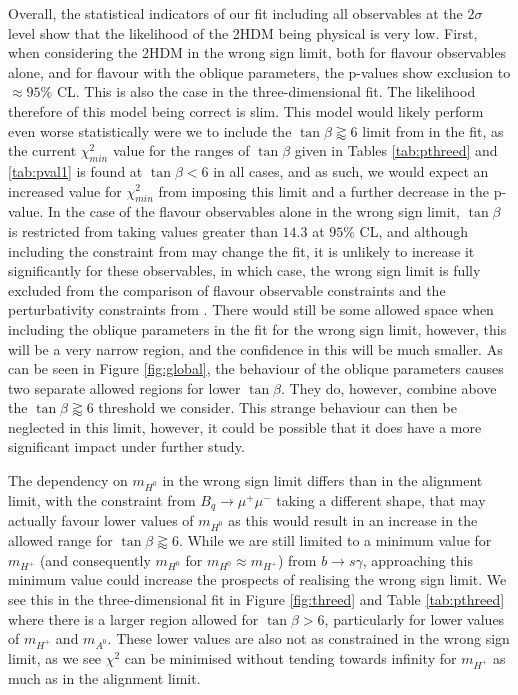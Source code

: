 \documentclass[a4paper,12pt]{article}
\begin{document}
Overall, the statistical indicators of our fit including all observables at the $2\sigma$ level show that the likelihood of the 2HDM being physical is very low. 
First, when considering the 2HDM in the wrong sign limit, both for flavour observables alone, and for flavour with the oblique parameters, the p-values show exclusion to $\approx95\%$ CL. 
This is also the case in the three-dimensional fit. 
The likelihood therefore of this model being correct is slim. 
This model would likely perform even worse statistically were we to include the $\tan\beta\gtrapprox6$ limit from \cite{oliver} in the fit, as the current $\chi^2_{min}$ value for the ranges of $\tan\beta$ given in Tables \ref{tab:pthreed} and \ref{tab:pval1} is found at $\tan\beta<6$ in all cases, and as such, we would expect an increased value for $\chi^2_{min}$ from imposing this limit and a further decrease in the p-value. 
In the case of the flavour observables alone in the wrong sign limit, $\tan\beta$ is restricted from taking values greater than $14.3$ at $95\%$ CL, and although including the constraint from \cite{oliver} may change the fit, it is unlikely to increase it significantly for these observables, in which case, the wrong sign limit is fully excluded from the comparison of flavour observable constraints and the perturbativity constraints from \cite{oliver}.
There would still be some allowed space when including the oblique parameters in the fit for the wrong sign limit, however, this will be a very narrow region, and the confidence in this will be much smaller.
As can be seen in Figure \ref{fig:global}, the behaviour of the oblique parameters causes two separate allowed regions for lower $\tan\beta$. 
They do, however, combine above the $\tan\beta\gtrapprox6$ threshold we consider. 
This strange behaviour can then be neglected in this limit, however, it could be possible that it does have a more significant impact under further study.

The dependency on $m_{H^0}$ in the wrong sign limit differs than in the alignment limit, with the constraint from $B_q\to\mu^+\mu^-$ taking a different shape, that may actually favour lower values of $m_{H^0}$ as this would result in an increase in the allowed range for $\tan\beta\gtrapprox6$.
While we are still limited to a minimum value for $m_{H^+}$ (and consequently $m_{H^0}$ for $m_{H^0}\approx m_{H^+}$) from $b\to s\gamma$, approaching this minimum value could increase the prospects of realising the wrong sign limit. 
We see this in the three-dimensional fit in Figure \ref{fig:threed} and Table \ref{tab:pthreed} where there is a larger region allowed for $\tan\beta>6$, particularly for lower values of $m_{H^+}$ and $m_{A^0}$. 
These lower values are also not as constrained in the wrong sign limit, as we see $\chi^2$ can be minimised without tending towards infinity for $m_{H^+}$ as much as in the alignment limit. 
\end{document}

